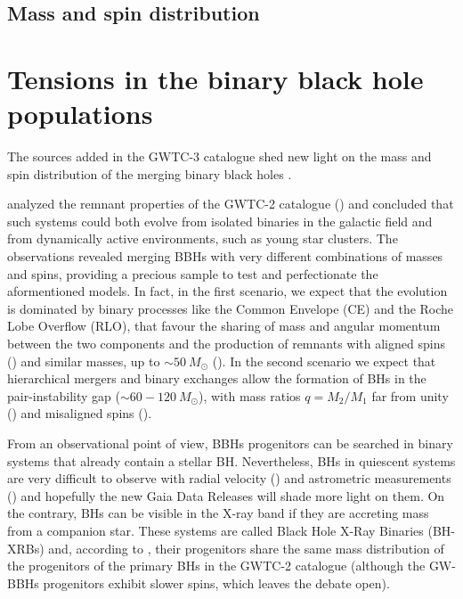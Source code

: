 \documentclass[a4paper,titlepage]{book}     	%
\newcommand{\sun}{\ensuremath{_\odot}}
\newcommand{\msun}{\ensuremath{M\sun}}
\begin{document}
\subsection{Mass and spin distribution}



\section{Tensions in the binary black hole populations}









The sources added in the GWTC-3 catalogue shed new light on the mass and spin distribution of the merging binary black holes \cite{GWTC-3_interpretation}. 




\cite{Abbot2021spectrumGW,HMXBH_spins2021} analyzed the remnant properties of the GWTC-2 catalogue (\cite{GWTC-2}) and concluded that such systems could both evolve from isolated binaries in the galactic field and from dynamically active environments, such as young star clusters. The observations revealed merging BBHs with very different combinations of masses and spins, providing a precious sample to test and perfectionate the aformentioned models. In fact, in the first scenario, we expect that the evolution is dominated by binary processes like the Common Envelope (CE) and the Roche Lobe Overflow (RLO), that favour the sharing of mass and angular momentum between the two components and the production of remnants with aligned spins (\cite{Kalogera2000_spinaligned}) and similar masses, up to $\sim 50~\msun$ (\cite{Giacobbo2018spectrum}). In the second scenario we expect that hierarchical mergers and binary exchanges allow the formation of BHs in the pair-instability gap ($\sim 60-120~\msun$), with mass ratios $q=M_2/M_1$ far from unity (\cite{Rastello2021_dynamics}) and misaligned spins (\cite{Rodriguez2016_BHspins}).

From an observational point of view, BBHs progenitors can be searched in binary systems that already contain a stellar BH. Nevertheless, BHs in quiescent systems are very difficult to observe with radial velocity (\cite{BHradialvelocity}) and astrometric measurements (\cite{GaiaDR2microlensing}) and hopefully the new Gaia Data Releases will shade more light on them. On the contrary, BHs can be visible in the X-ray band if they are accreting mass from a companion star. These systems are called Black Hole X-Ray Binaries (BH-XRBs) and, according to \cite{HMXBH_spins2021}, their progenitors share the same mass distribution of the progenitors of the primary BHs in the GWTC-2 catalogue (although the GW-BBHs progenitors exhibit slower spins, which leaves the debate open).
\end{document}

